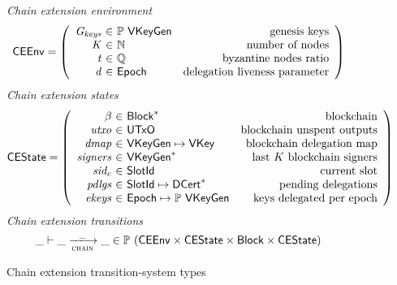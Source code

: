 \documentclass[11pt,a4paper]{article}
\newcommand{\powerset}[1]{\mathbb{P}~#1}
\newcommand{\var}[1]{\mathit{#1}}
\newcommand{\type}[1]{\mathsf{#1}}
\newcommand{\trans}[2]{\xlongrightarrow[\textsc{#1}]{#2}}
\newcommand{\seqof}[1]{#1^{*}}
\newcommand{\UTxO}{\type{UTxO}}
\newcommand{\VKey}{\type{VKey}}
\newcommand{\DCert}{\type{DCert}}
\newcommand{\Epoch}{\type{Epoch}}
\newcommand{\VKeyGen}{\type{VKeyGen}}
\newcommand{\Gkeys}{\var{G_{keys}}}
\newcommand{\Block}{\type{Block}}
\newcommand{\SlotId}{\type{SlotId}}
\newcommand{\CEEnv}{\type{CEEnv}}
\newcommand{\CEState}{\type{CEState}}
\begin{document}
\begin{figure}
  \emph{Chain extension environment}
  \begin{equation*}
    \CEEnv =
    \left(
      \begin{array}{r@{~\in~}lr}
        \var{\Gkeys} & \powerset{\VKeyGen} & \text{genesis keys}\\
        \var{K} & \mathbb{N} & \text{number of nodes}\\
        \var{t} & \mathbb{Q} & \text{byzantine nodes ratio}\\
        \var{d} & \Epoch & \text{delegation liveness parameter}\\
      \end{array}
    \right)
  \end{equation*}
  \emph{Chain extension states}
  \begin{equation*}
    \CEState =
    \left(
      \begin{array}{r@{~\in~}lr}
        \beta & \seqof{\Block} & \text{blockchain}\\
        \var{utxo} & \UTxO & \text{blockchain unspent outputs}\\
        \var{dmap} & \VKeyGen \mapsto \VKey & \text{blockchain delegation map}\\
        \var{signers} & \seqof{\VKeyGen} & \text{last $K$ blockchain signers}\\
        \var{sid_c} & \SlotId & \text{current slot}\\
        \var{pdlgs} & \SlotId \mapsto \seqof{\DCert} & \text{pending delegations}\\
        \var{ekeys} & \Epoch \mapsto \powerset{\VKeyGen} & \text{keys delegated per epoch}
      \end{array}
    \right)
  \end{equation*}
  \emph{Chain extension transitions}
  \begin{equation*}
    \_ \vdash \_ \trans{chain}{\_} \_ \in
      \powerset (\CEEnv \times \CEState \times \Block \times \CEState)
  \end{equation*}
  \caption{Chain extension transition-system types}
  \label{fig:chain-ts-types}
\end{figure}
\end{document}
